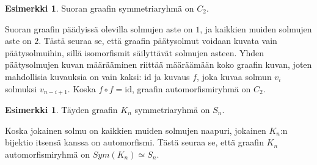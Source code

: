 \documentclass[a4paper, 12pt]{article}
\theoremstyle{definition}
\newtheorem{example}[mydef]{Esimerkki}
\theoremstyle{plain}
\begin{document}
\begin{example}
Suoran graafin symmetriaryhmä on $C_2$.

\begin{center}
\end{center}

Suoran graafin päädyissä olevilla solmujen aste on $1$, ja kaikkien muiden solmujen aste on $2$. Tästä seuraa se, että graafin päätysolmut voidaan kuvata vain päätysolmuihin, sillä isomorfismit säilyttävät solmujen asteen. Yhden päätysolmujen kuvan määrääminen riittää määräämään koko graafin kuvan, joten mahdollisia kuvauksia on vain kaksi: $\mathrm{id}$ ja kuvaus $f$, joka kuvaa solmun $v_i$ solmuksi $v_{n - i + 1}$. Koska $f \circ f = \mathrm{id}$, graafin automorfismiryhmä on $C_2$.
\end{example}

\begin{example}
Täyden graafin $K_n$ symmetriaryhmä on $S_n$.

\begin{center}
\end{center}

Koska jokainen solmu on kaikkien muiden solmujen naapuri, jokainen $K_n$:n bijektio itsensä kanssa on automorfismi. Tästä seuraa se, että graafin $K_n$ automorfismiryhmä on $Sym(K_n) \simeq S_n$.
\end{example}
\end{document}
